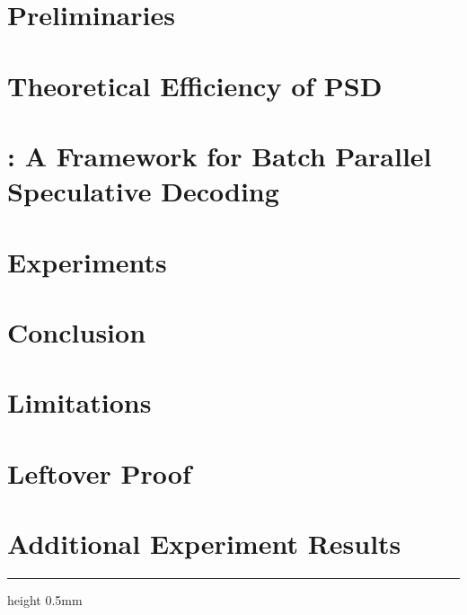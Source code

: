 \documentclass{article}
\begin{document}
    \section{Preliminaries}
    \label{sec:preliminaries}
    


    \section{Theoretical Efficiency of PSD}
    \label{sec:theoretical_analysis}
    
    
    
    \section{\alg: A Framework for Batch Parallel Speculative Decoding}
    \label{sec:minedraft}
    
    

    \section{Experiments}
    \label{sec:experiments}
    	
    
    
    \section{Conclusion}
    \label{sec:conclusion}
    
    
    
    \section*{Limitations}
    \label{sec:limitations}
    


	
	


    \clearpage    
    \onecolumn
    \appendix

    
    \section{Leftover Proof}
    \label{asec:proof}
    
    
    \section{Additional Experiment Results}
    \label{sec:appendix}
    
    

    
        
    \hrule height 0.5mm
\end{document}
